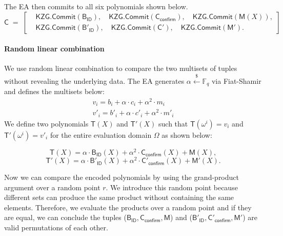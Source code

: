 The EA then commits to all six polynomials shown below.
\[
\mathsf{C} \;=\;
\left[
\begin{aligned}
&\mathsf{KZG.Commit}(\mathsf{B}_\mathsf{ID}),\quad
 \mathsf{KZG.Commit}(\mathsf{C}_\mathsf{confirm}),\quad
 \mathsf{KZG.Commit}(\mathsf{M}(X)),\\
&\mathsf{KZG.Commit}(\mathsf{B}'_\mathsf{ID}),\quad
 \mathsf{KZG.Commit}(\mathsf{C}'),\quad
 \mathsf{KZG.Commit}(\mathsf{M}').
\end{aligned}
\right]
\]


\paragraph{Random linear combination}\mbox{}\newline
We use random linear combination to compare the two multisets of tuples without revealing the underlying data.
The EA generates
$\alpha \stackrel{\$}{\leftarrow} \mathbb{F}_q$ via Fiat-Shamir and defines the multisets below:
\begin{align}
  v_i = b_i + \alpha \cdot c_i + \alpha^2 \cdot m_i \label{eq:perm-v}\\
  v'_i = b'_i + \alpha \cdot c'_i + \alpha^2 \cdot m'_i \label{eq:perm-vprime}
\end{align}
We define two polynomials $\mathsf{T}(X)$ and $\mathsf{T}'(X)$ such that
$\mathsf{T}(\omega^i) = v_i$ and $\mathsf{T}'(\omega^i) = v'_i$ for the entire evaluation domain $\Omega$ as shown below:

\begin{equation}
\label{eq:tone}
\mathsf{T}(X) = \alpha\cdot \mathsf{B}_\mathsf{ID}(X)+\alpha^2\cdot \mathsf{C}_\mathsf{confirm}(X)+ \mathsf{M}(X),
\end{equation}
\begin{equation}
\label{eq:ttwo}
\mathsf{T}'(X) = \alpha\cdot \mathsf{B}'_\mathsf{ID}(X)+\alpha^2\cdot \mathsf{C}'_\mathsf{confirm}(X)+ \mathsf{M}'(X).
\end{equation}

Now we can compare the encoded polynomials by using the grand-product argument over a random point $r$. 
We introduce this random point because different sets can produce the same product without containing the same elements. Therefore, we evaluate the products over a random point and if they are equal, we can conclude the tuples ($\mathsf{B_{ID}}, \mathsf{C_{confirm}}, \mathsf{M}$) and ($\mathsf{B'_{ID}}, \mathsf{C'_{confirm}}, \mathsf{M}'$) are valid permutations of each other.

